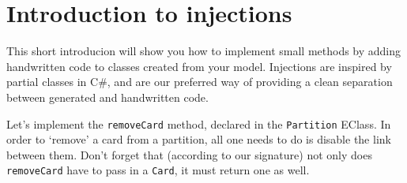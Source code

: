 \newpage
\section{Introduction to injections}
\genHeader

This short introducion will show you how to implement small methods by adding handwritten code to classes created from your model. Injections are inspired by
partial classes in C\#, and are our preferred way of providing a clean separation between generated and handwritten code. 

Let's implement the \texttt{removeCard} method, declared in the \texttt{Partition} EClass. In order to `remove' a card from a partition, all one needs to do is
disable the link between them. Don't forget that (according to our signature) not only does \texttt{removeCard} have to pass in a \texttt{Card}, it must return
one as well.

